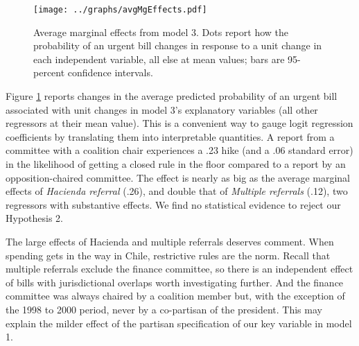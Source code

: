 \documentclass[letter,12pt]{article}
\begin{document}

\begin{figure}
  \centering
    \caption{Average marginal effects from model 3. Dots report how the probability of an urgent bill changes in response to a unit change in each independent variable, all else at mean values; bars are 95-percent confidence intervals.}\label{F:avgMg}
    \texttt{[image: ../graphs/avgMgEffects.pdf]}
\end{figure}

Figure \ref{F:avgMg} reports changes in the average predicted probability of an urgent bill associated with unit changes in model 3's explanatory variables (all other regressors at their mean value). This is a convenient way to gauge logit regression coefficients by translating them into interpretable quantities. A report from a committee with a coalition chair experiences a .23 hike (and a .06 standard error) in the likelihood of getting a closed rule in the floor compared to a report by an opposition-chaired committee. The effect is nearly as big as the average marginal effects of \emph{Hacienda referral} (.26), and double that of \emph{Multiple referrals} (.12), two regressors with substantive effects. We find no statistical evidence to reject our Hypothesis 2.  

The large effects of Hacienda and multiple referrals deserves comment. When spending gets in the way in Chile, restrictive rules are the norm. Recall that multiple referrals exclude the finance committee, so there is an independent effect of bills with jurisdictional overlaps worth investigating further. And the finance committee was always chaired by a coalition member but, with the exception of the 1998 to 2000 period, never by a co-partisan of the president. This may explain the milder effect of the partisan specification of our key variable in model 1. 
\end{document}

